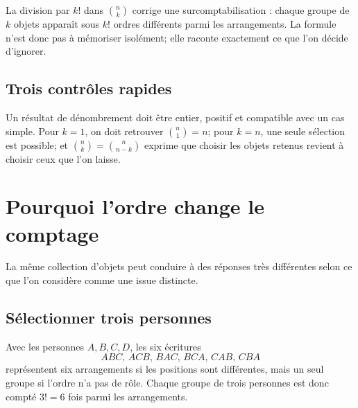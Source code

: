 \documentclass[12pt,a4paper,openany]{book}
\begin{document}
\begin{connectionbox}
La division par $k!$ dans $\binom nk$ corrige une surcomptabilisation : chaque groupe de $k$ objets apparaît sous $k!$ ordres différents parmi les arrangements. La formule n'est donc pas à mémoriser isolément; elle raconte exactement ce que l'on décide d'ignorer.
\end{connectionbox}

\subsection{Trois contrôles rapides}
Un résultat de dénombrement doit être entier, positif et compatible avec un cas simple. Pour $k=1$, on doit retrouver $\binom n1=n$; pour $k=n$, une seule sélection est possible; et $\binom nk=\binom n{n-k}$ exprime que choisir les objets retenus revient à choisir ceux que l'on laisse.


\section{Pourquoi l'ordre change le comptage}

La même collection d'objets peut conduire à des réponses très différentes selon ce que l'on considère comme une issue distincte.

\subsection{Sélectionner trois personnes}
Avec les personnes $A,B,C,D$, les six écritures
\[
ABC,\,ACB,\,BAC,\,BCA,\,CAB,\,CBA
\]
représentent six arrangements si les positions sont différentes, mais un seul groupe si l'ordre n'a pas de rôle. Chaque groupe de trois personnes est donc compté $3!=6$ fois parmi les arrangements.

\begin{center}
\end{center}
\end{document}
